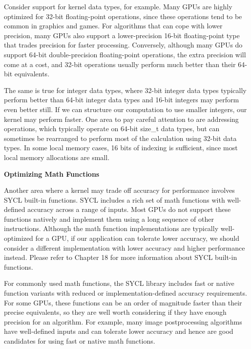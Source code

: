 Consider support for kernel data types, for example. Many GPUs are highly optimized for 32-bit floating-point operations, since these operations tend to be common in graphics and games. For algorithms that can cope with lower precision, many GPUs also support a lower-precision 16-bit floating-point type that trades precision for faster processing. Conversely, although many GPUs do support 64-bit double-precision floating-point operations, the extra precision will come at a cost, and 32-bit operations usually perform much better than their 64-bit equivalents.\par

The same is true for integer data types, where 32-bit integer data types typically perform better than 64-bit integer data types and 16-bit integers may perform even better still. If we can structure our computation to use smaller integers, our kernel may perform faster. One area to pay careful attention to are addressing operations, which typically operate on 64-bit size\_t data types, but can sometimes be rearranged to perform most of the calculation using 32-bit data types. In some local memory cases, 16 bits of indexing is sufficient, since most local memory allocations are small.\par

\hspace*{\fill} \par %
\textbf{Optimizing Math Functions}

Another area where a kernel may trade off accuracy for performance involves SYCL built-in functions. SYCL includes a rich set of math functions with well-defined accuracy across a range of inputs. Most GPUs do not support these functions natively and implement them using a long sequence of other instructions. Although the math function implementations are typically well-optimized for a GPU, if our application can tolerate lower accuracy, we should consider a different implementation with lower accuracy and higher performance instead. Please refer to Chapter 18 for more information about SYCL built-in functions.\par

For commonly used math functions, the SYCL library includes fast or native function variants with reduced or implementation-defined accuracy requirements. For some GPUs, these functions can be an order of magnitude faster than their precise equivalents, so they are well worth considering if they have enough precision for an algorithm. For example, many image postprocessing algorithms have well-defined inputs and can tolerate lower accuracy and hence are good candidates for using fast or native math functions.\par

